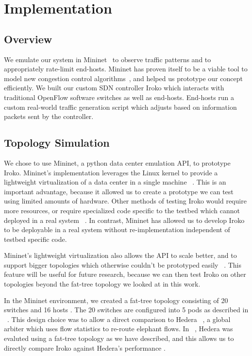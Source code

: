 

\section{Implementation}
\subsection{Overview}

We emulate our system in Mininet~\cite{mininet} to observe traffic 
patterns and to appropriately rate-limit end-hosts. Mininet has proven itself to be 
a viable tool to model new congestion control 
algorithms~\cite{mininet_learning}, and helped us prototype our concept 
efficiently. We built our custom SDN controller Iroko which interacts with 
traditional OpenFlow software switches as well as end-hosts. End-hosts run 
a custom real-world traffic generation script which adjusts based on 
information packets sent by the controller.


\subsection{Topology Simulation}
We chose to use  Mininet, a python data center emulation API, to prototype Iroko. Mininet's implementation leverages the Linux kernel to provide a lightweight virtualization of a data center in a single machine ~\cite{mininet}. This is an important advantage, because it allowed us to create a prototype we can test using limited amounts of hardware. Other methods of testing Iroko would require more resources, or require specialized code specific to the testbed which cannot deployed in a real system ~\cite{mininet}. In contrast, Mininet has allowed us to develop Iroko to be deployable in a real system without re-implementation independent of testbed specific code. 

Mininet’s lightweight virtualization also allows the API to scale better, and to support bigger topologies which otherwise couldn’t be prototyped easily ~\cite{mininet}. This feature will be useful for future research, because we can then test Iroko on other topologies beyond the fat-tree topology we looked at in this work. 

In the Mininet environment, we created a fat-tree topology consisting of 20 switches and 16 hosts . The 20 switches are configured into 5 pods as described in ~\cite{fattree}. This design choice was to allow a direct comparison to Hedera  ~\cite{hedera}, a global arbiter which uses flow statistics to re-route elephant flows. In ~\cite{hedera}, Hedera was evaluted  using a fat-tree topology as we have described, and this allows us to directly compare Iroko against Hedera's performance . 

